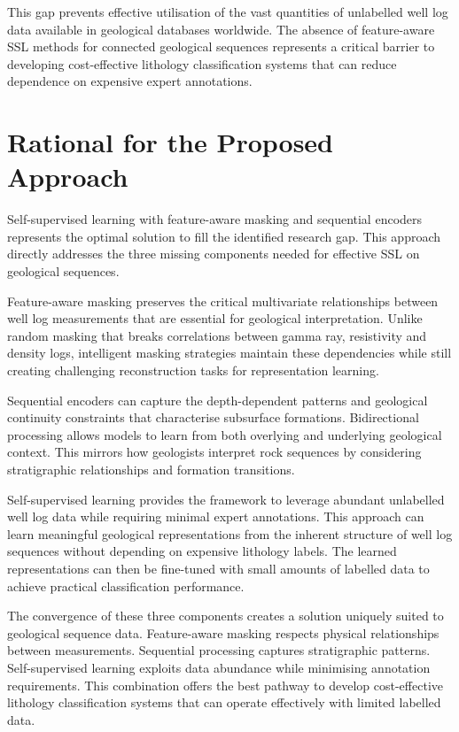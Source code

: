 This gap prevents effective utilisation of the vast quantities of unlabelled well log data available in geological databases worldwide. The absence of feature-aware SSL methods for connected geological sequences represents a critical barrier to developing cost-effective lithology classification systems that can reduce dependence on expensive expert annotations.


\section{Rational for the Proposed Approach}

Self-supervised learning with feature-aware masking and sequential encoders represents the optimal solution to fill the identified research gap. This approach directly addresses the three missing components needed for effective SSL on geological sequences.

Feature-aware masking preserves the critical multivariate relationships between well log measurements that are essential for geological interpretation. Unlike random masking that breaks correlations between gamma ray, resistivity and density logs, intelligent masking strategies maintain these dependencies while still creating challenging reconstruction tasks for representation learning.

Sequential encoders can capture the depth-dependent patterns and geological continuity constraints that characterise subsurface formations. Bidirectional processing allows models to learn from both overlying and underlying geological context. This mirrors how geologists interpret rock sequences by considering stratigraphic relationships and formation transitions.

Self-supervised learning provides the framework to leverage abundant unlabelled well log data while requiring minimal expert annotations. This approach can learn meaningful geological representations from the inherent structure of well log sequences without depending on expensive lithology labels. The learned representations can then be fine-tuned with small amounts of labelled data to achieve practical classification performance.

The convergence of these three components creates a solution uniquely suited to geological sequence data. Feature-aware masking respects physical relationships between measurements. Sequential processing captures stratigraphic patterns. Self-supervised learning exploits data abundance while minimising annotation requirements. This combination offers the best pathway to develop cost-effective lithology classification systems that can operate effectively with limited labelled data.


